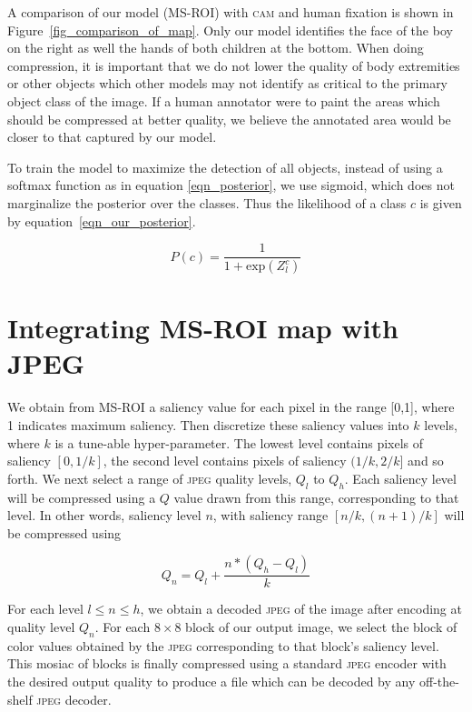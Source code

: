 A comparison of our model (MS-ROI) with \textsc{cam} and human fixation is shown in Figure~\ref{fig_comparison_of_map}. 
Only our model identifies the face of the boy on the right as well the hands of both children at the bottom. 
When doing compression, it is important that we do not lower the quality of body extremities or other objects which other models may not identify as critical to the primary object class of the image.
If a human annotator were to paint the areas which should be compressed at better quality, we believe the annotated area would be closer to that captured by our model.

To train the model to maximize the detection of all objects, instead of using a softmax function as in equation \ref{eqn_posterior}, we use sigmoid, which does not marginalize the posterior over the classes.
Thus the likelihood of a class $c$ is given by equation~\ref{eqn_our_posterior}. 

\begin{equation}
    P(c) = \frac{1}{1 + \text{exp}(Z^c_l)}
    \label{eqn_our_posterior}
\end{equation}

\section{Integrating MS-ROI map with JPEG}
We obtain from MS-ROI a saliency value for each pixel in the range [0,1], where 1 indicates maximum saliency.
Then discretize these saliency values into $k$ levels, where $k$ is a tune-able hyper-parameter.
The lowest level contains pixels of saliency $[0,1/k]$, the second level contains pixels of saliency $(1/k,2/k]$ and so forth.
We next select a range of \textsc{jpeg} quality levels, $Q_l$ to $Q_h$.  Each saliency level will be compressed using a $Q$ value drawn from this range, corresponding to that level.
In other words, saliency level $n$, with saliency range $[n/k,(n+1)/k]$ will be compressed using 

\begin{equation}
Q_n = Q_l + \frac{n*(Q_h - Q_l)}{k}
\end{equation}


For each level $l \le n \le h$, we obtain a decoded \textsc{jpeg} of the image after encoding at quality level $Q_n$.
For each $8 \times 8$ block of our output image, we select the block of color values obtained by the \textsc{jpeg} corresponding to that block's saliency level.  This mosiac of blocks is finally compressed using a standard \textsc{jpeg} encoder with the desired output quality to produce a file which can be decoded by any off-the-shelf \textsc{jpeg} decoder.

